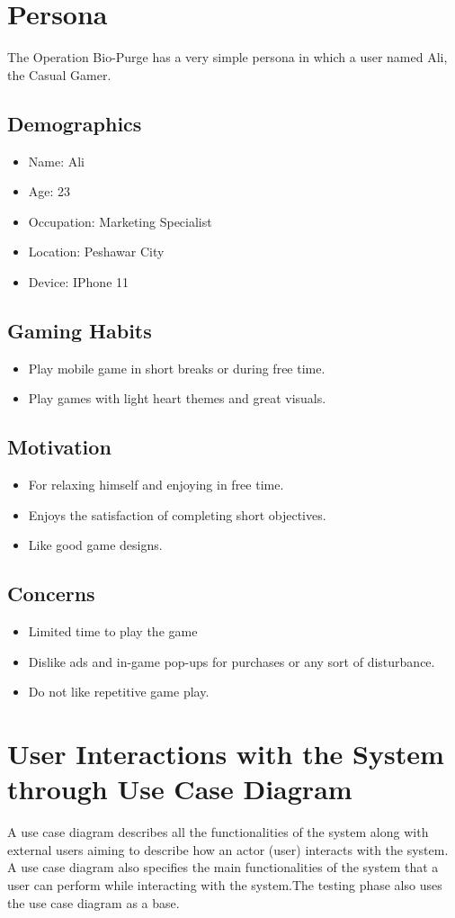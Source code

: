 \section{Persona}
The Operation Bio-Purge has a very simple persona in which a user named Ali, the Casual Gamer.
\subsection{Demographics}
\begin{itemize}
	\item 	Name: Ali
	\item 	Age: 23
	\item 	Occupation: Marketing Specialist
	\item   Location: Peshawar City
	\item 	Device: IPhone 11
\end{itemize}
\subsection{Gaming Habits}
\begin{itemize}
	\item 	Play mobile game in short breaks or during free time.
	\item 	Play games with light heart themes and great visuals.
\end{itemize}
\subsection{Motivation}
\begin{itemize}
	\item For relaxing himself and enjoying in free time.
	\item 	Enjoys the satisfaction of completing short objectives.
	\item 	Like good game designs.
\end{itemize}
\subsection{Concerns}
\begin{itemize}
	\item 	Limited time to play the game
	\item	Dislike ads and in-game pop-ups for purchases or any sort of disturbance.
	\item	Do not like repetitive game play.
\end{itemize}


\section{User Interactions with the System through Use Case Diagram}
A use case diagram describes all the functionalities of the system along with external users aiming to describe how an actor (user) interacts with the system.
A use case diagram also specifies the main functionalities of the system that a user can perform while interacting with the system.The testing phase also uses the use case diagram as a base.\\
\\

